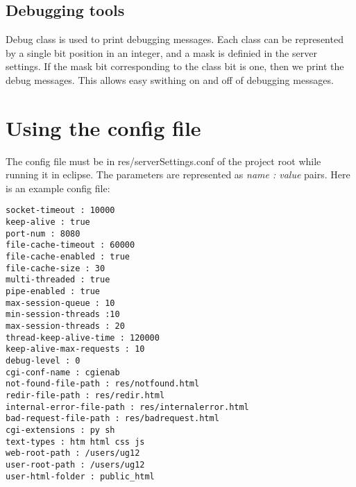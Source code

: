 \documentclass[12pt,a4paper,final]{article}
\begin{document}
\subsection{Debugging tools}
Debug class is used to print debugging messages. Each class can be represented by a single bit position in an integer, and a mask is definied in the server settings. If the mask bit corresponding to the class bit is one, then we print the debug messages. This allows easy swithing on and off of debugging messages.
\pagebreak
\section{Using the config file}
The config file must be in res/serverSettings.conf of the project root while running it in eclipse. The parameters are represented as \emph{name : value} pairs. Here is an example config file:
\begin{verbatim}
socket-timeout : 10000
keep-alive : true
port-num : 8080
file-cache-timeout : 60000
file-cache-enabled : true
file-cache-size : 30
multi-threaded : true
pipe-enabled : true
max-session-queue : 10
min-session-threads :10 
max-session-threads : 20
thread-keep-alive-time : 120000
keep-alive-max-requests : 10
debug-level : 0
cgi-conf-name : cgienab
not-found-file-path : res/notfound.html
redir-file-path : res/redir.html
internal-error-file-path : res/internalerror.html
bad-request-file-path : res/badrequest.html
cgi-extensions : py sh
text-types : htm html css js 
web-root-path : /users/ug12
user-root-path : /users/ug12
user-html-folder : public_html
\end{verbatim}
\end{document}
